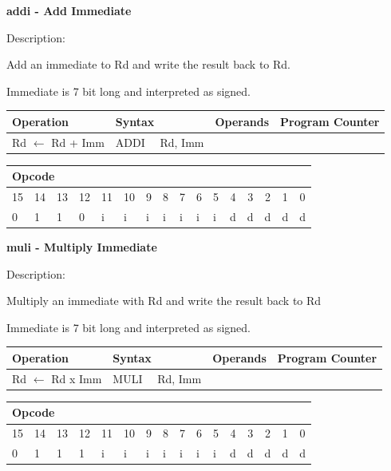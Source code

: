 \documentclass[%
	pdftex,
	a4paper,
	oneside,
	bibtotoc,%
	idxtotoc,%
	bibtotocnumbered,
	halfparskip,%
]{scrbook}
\begin{document}
\bigskip

\textbf{addi - Add Immediate}

Description:

Add an immediate to Rd and write the result back to Rd.

Immediate is 7 bit long and interpreted as signed.

\begin{tabular}{|l|l|l|l|}
\hline
Operation & Syntax & Operands & Program Counter \\ \hline
Rd $\leftarrow $ Rd + Imm & ADDI \ \ Rd, Imm &  &  \\ \hline
\end{tabular}

\begin{tabular}{|c|c|c|c|c|c|c|c|c|c|c|c|c|c|c|c|}
\hline
\multicolumn{6}{|l|}{Opcode} & \multicolumn{5}{|l|}{} & \multicolumn{5}{|l|}{
} \\ \hline
15 & 14 & 13 & 12 & 11 & 10 & 9 & 8 & 7 & 6 & 5 & 4 & 3 & 2 & 1 & 0 \\ \hline
\multicolumn{1}{|l|}{0} & \multicolumn{1}{|l|}{1} & \multicolumn{1}{|l|}{1}
& \multicolumn{1}{|l|}{0} & \multicolumn{1}{|l|}{i} & \multicolumn{1}{|l|}{i}
& \multicolumn{1}{|l|}{i} & \multicolumn{1}{|l|}{i} & \multicolumn{1}{|l|}{i}
& \multicolumn{1}{|l|}{i} & \multicolumn{1}{|l|}{i} & \multicolumn{1}{|l|}{d}
& \multicolumn{1}{|l|}{d} & \multicolumn{1}{|l|}{d} & \multicolumn{1}{|l|}{d}
& \multicolumn{1}{|l|}{d} \\ \hline
\end{tabular}

\bigskip

\textbf{muli - Multiply Immediate}

Description:

Multiply an immediate with Rd and write the result back to Rd

Immediate is 7 bit long and interpreted as signed.

\begin{tabular}{|l|l|l|l|}
\hline
Operation & Syntax & Operands & Program Counter \\ \hline
Rd $\leftarrow $ Rd x Imm & MULI \ \ Rd, Imm &  &  \\ \hline
\end{tabular}

\begin{tabular}{|c|c|c|c|c|c|c|c|c|c|c|c|c|c|c|c|}
\hline
\multicolumn{6}{|l|}{Opcode} & \multicolumn{5}{|l|}{} & \multicolumn{5}{|l|}{
} \\ \hline
15 & 14 & 13 & 12 & 11 & 10 & 9 & 8 & 7 & 6 & 5 & 4 & 3 & 2 & 1 & 0 \\ \hline
\multicolumn{1}{|l|}{0} & \multicolumn{1}{|l|}{1} & \multicolumn{1}{|l|}{1}
& \multicolumn{1}{|l|}{1} & \multicolumn{1}{|l|}{i} & \multicolumn{1}{|l|}{i}
& \multicolumn{1}{|l|}{i} & \multicolumn{1}{|l|}{i} & \multicolumn{1}{|l|}{i}
& \multicolumn{1}{|l|}{i} & \multicolumn{1}{|l|}{i} & \multicolumn{1}{|l|}{d}
& \multicolumn{1}{|l|}{d} & \multicolumn{1}{|l|}{d} & \multicolumn{1}{|l|}{d}
& \multicolumn{1}{|l|}{d} \\ \hline
\end{tabular}
\end{document}
